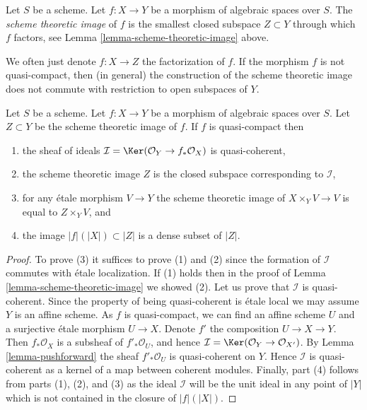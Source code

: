 \begin{definition}
\label{definition-scheme-theoretic-image}
Let $S$ be a scheme. Let $f : X \to Y$ be a morphism of algebraic spaces
over $S$. The {\it scheme theoretic image} of $f$ is the smallest closed
subspace $Z \subset Y$ through which $f$
factors, see Lemma \ref{lemma-scheme-theoretic-image} above.
\end{definition}

\noindent
We often just denote $f : X \to Z$ the factorization of $f$.
If the morphism $f$ is not quasi-compact, then (in general) the
construction of the scheme theoretic image does not commute with
restriction to open subspaces of $Y$.

\begin{lemma}
\label{lemma-quasi-compact-scheme-theoretic-image}
Let $S$ be a scheme.
Let $f : X \to Y$ be a morphism of algebraic spaces over $S$.
Let $Z \subset Y$ be the scheme theoretic image of $f$.
If $f$ is quasi-compact then
\begin{enumerate}
\item the sheaf of ideals
$\mathcal{I} = \Ker(\mathcal{O}_Y \to f_*\mathcal{O}_X)$
is quasi-coherent,
\item the scheme theoretic image $Z$ is the closed subspace
corresponding to $\mathcal{I}$,
\item for any \'etale morphism $V \to Y$ the scheme theoretic image of
$X \times_Y V \to V$ is equal to $Z \times_Y V$, and
\item the image $|f|(|X|) \subset |Z|$ is a dense subset of $|Z|$.
\end{enumerate}
\end{lemma}

\begin{proof}
To prove (3) it suffices to prove (1) and (2) since the
formation of $\mathcal{I}$ commutes with \'etale localization.
If (1) holds then in the proof of Lemma \ref{lemma-scheme-theoretic-image}
we showed (2). Let us prove that $\mathcal{I}$ is quasi-coherent.
Since the property of being quasi-coherent is \'etale local we may
assume $Y$ is an affine scheme. As $f$ is quasi-compact,
we can find an affine scheme $U$ and a surjective \'etale morphism
$U \to X$. Denote $f'$ the composition $U \to X \to Y$.
Then $f_*\mathcal{O}_X$ is a subsheaf of $f'_*\mathcal{O}_U$,
and hence $\mathcal{I} = \Ker(\mathcal{O}_Y \to \mathcal{O}_{X'})$.
By Lemma \ref{lemma-pushforward}
the sheaf $f'_*\mathcal{O}_U$ is quasi-coherent on $Y$. Hence $\mathcal{I}$
is quasi-coherent as a kernel of a map between coherent modules.
Finally, part (4) follows from parts (1), (2), and (3) as the ideal
$\mathcal{I}$ will be the unit ideal in any point of $|Y|$ which is
not contained in the closure of $|f|(|X|)$.
\end{proof}

